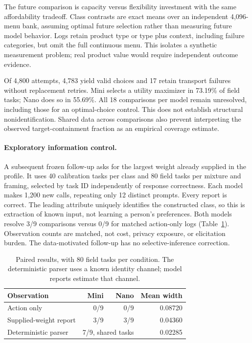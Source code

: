 \documentclass[runningheads]{llncs}
\begin{document}
The future comparison is capacity versus flexibility investment with the same affordability tradeoff. Class contrasts are exact means over an independent 4,096-menu bank, assuming optimal future selection rather than measuring future model behavior. Logs retain product type or type plus context, including failure categories, but omit the full continuous menu. This isolates a synthetic measurement problem; real product value would require independent outcome evidence.

Of 4,800 attempts, 4,783 yield valid choices and 17 retain transport failures without replacement retries. Mini selects a utility maximizer in 73.19\% of field tasks; Nano does so in 55.69\%. All 18 comparisons per model remain unresolved, including those for an optimal-choice control. This does not establish structural nonidentification. Shared data across comparisons also prevent interpreting the observed target-containment fraction as an empirical coverage estimate.

\paragraph{Exploratory information control.}
A subsequent frozen follow-up asks for the largest weight already supplied in the profile. It uses 40 calibration tasks per class and 80 field tasks per mixture and framing, selected by task ID independently of response correctness. Each model makes 1,200 new calls, repeating only 12 distinct prompts. Every report is correct. The leading attribute uniquely identifies the constructed class, so this is extraction of known input, not learning a person's preferences. Both models resolve 3/9 comparisons versus 0/9 for matched action-only logs (Table~\ref{tab:results}). Observation counts are matched, not cost, privacy exposure, or elicitation burden. The data-motivated follow-up has no selective-inference correction.

\begin{table}[t]
\caption{Paired results, with 80 field tasks per condition. The deterministic parser uses a known identity channel; model reports estimate that channel.}
\label{tab:results}
\centering
\begin{tabular}{lrrr}
\toprule Observation & Mini & Nano & Mean width \\
\midrule
Action only & 0/9 & 0/9 & 0.08720 \\
Supplied-weight report & 3/9 & 3/9 & 0.04360 \\
Deterministic parser & \multicolumn{2}{c}{7/9, shared tasks} & 0.02285 \\
\bottomrule
\end{tabular}
\end{table}
\end{document}
